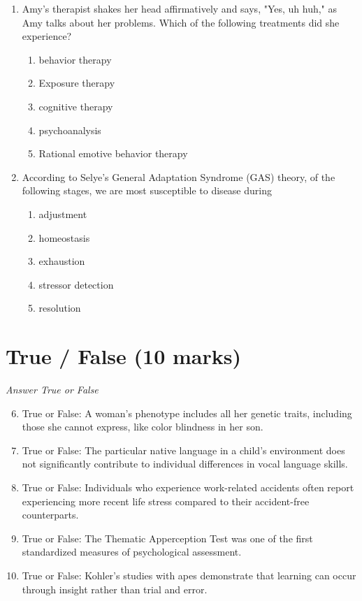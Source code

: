 \documentclass[12pt]{article}
\begin{document}
\begin{enumerate}[label=\arabic*.]
\begin{enumerate}[label=(\alph*)]
    \item III only
\end{enumerate}
\item Amy's therapist shakes her head affirmatively and says, "Yes, uh huh," as Amy talks about her problems. Which of the following treatments did she experience?
\begin{enumerate}[label=(\alph*)]
    \item behavior therapy
    \item Exposure therapy
    \item cognitive therapy
    \item psychoanalysis
    \item Rational emotive behavior therapy
\end{enumerate}
\item According to Selye's General Adaptation Syndrome (GAS) theory, of the following stages, we are most susceptible to disease during
\begin{enumerate}[label=(\alph*)]
    \item adjustment
    \item homeostasis
    \item exhaustion
    \item stressor detection
    \item resolution
\end{enumerate}
\end{enumerate}

\section*{True / False (10 marks)}
\textit{Answer True or False}
\begin{enumerate}[label=\arabic*.]
\setcounter{enumi}{5}
\item True or False: A woman's phenotype includes all her genetic traits, including those she cannot express, like color blindness in her son.
\item True or False: The particular native language in a child's environment does not significantly contribute to individual differences in vocal language skills.
\item True or False: Individuals who experience work-related accidents often report experiencing more recent life stress compared to their accident-free counterparts.
\item True or False: The Thematic Apperception Test was one of the first standardized measures of psychological assessment.
\item True or False: Kohler's studies with apes demonstrate that learning can occur through insight rather than trial and error.
\end{enumerate}
\end{document}

